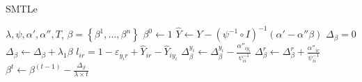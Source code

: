 \begin{algorithm}\label{alg:1}
       \caption{SMTLe}\label{alg:1}
        \begin{algorithmic}[1]
            \REQUIRE $\lambda, \psi,\alpha',\alpha'',T$,
            \ENSURE $\beta=\left\{\beta^1,...,\beta^n\right\}$
            \STATE $\beta^0 \leftarrow 1$
                \STATE $\hat Y \leftarrow Y - {\left( {\psi^{-1} \circ I} \right)^{ - 1}}\left( \alpha' - \alpha''\beta \right)$
                \STATE ${\Delta _\beta }=0$
                	\STATE ${\Delta _\beta }\leftarrow {\Delta _\beta }+\lambda_1\beta$ 
	                    \STATE $l_{ir} = 1 - {\varepsilon _{{y_i}r}} + {\hat Y_{ir}} - {\hat Y_{i{y_i}}}$
	                            \STATE $\Delta _\beta^{{y_i}} \leftarrow \Delta _\beta^{{y_i}} - \frac{{{\alpha''_{i{y_i}}}}}{{{\psi^{-1}_{ii}}}}$%
	                            \STATE $\Delta _\beta^{{r}} \leftarrow \Delta _\beta^{{r}} + \frac{{{\alpha''_{i{r}}}}}{{{\psi^{-1}_{ii}}}}$%
	                    \ENDIF
	                 \ENDFOR %
                \ENDFOR %
                \STATE $\beta^t  \leftarrow \beta^{(t-1)}  - \frac{{{\Delta _\beta }}}{{\lambda\times {t} }}$
             \ENDFOR %
        \end{algorithmic}
\end{algorithm}